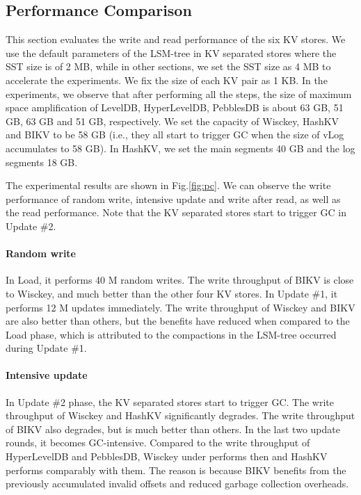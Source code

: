 \documentclass[sigconf]{acmart}
\begin{document}
\subsection{Performance Comparison}
This section evaluates the write and read performance of the six KV stores. We use the default parameters of the LSM-tree in KV separated stores where the SST size is of 2 MB, while in other sections, we set the SST size as 4 MB to accelerate the experiments. We fix the size of each KV pair as 1 KB. In the experiments, we observe that after performing all the steps, the size of maximum space amplification of LevelDB, HyperLevelDB, PebblesDB {\color{red}{KVell}} is about 63 GB, 51 GB, 63 GB and 51 GB, respectively.  We set the capacity of Wisckey, HashKV and BIKV to be 58 GB (i.e., they all start to trigger GC when the size of vLog accumulates to 58 GB). In HashKV, we set the main segments 40 GB and the log segments 18 GB. 

The experimental results are shown in Fig.\ref{fig:pc}. We can observe the write performance of random write, intensive update and write after read, as well as the read performance. Note that the KV separated stores start to trigger GC in Update \#2.

\paragraph*{Random write}
In Load, it performs 40 M random writes. The write throughput of BIKV is close to Wisckey, and much better than the other four KV stores. In Update \#1, it performs 12 M updates immediately. The write throughput of Wisckey and BIKV are also better than others, but the benefits have reduced when compared to the Load phase, which is attributed to the compactions in the LSM-tree occurred during Update \#1. {\color{red}{The write throughput of KVell significantly degrades caused by the costly update operation.}}

\paragraph*{Intensive update}
In Update \#2 phase, the KV separated stores start to trigger GC. The write throughput of Wisckey and HashKV significantly degrades. The write throughput of BIKV also degrades, but is much better than others. In the last two update rounds, it becomes GC-intensive. Compared to the write throughput of HyperLevelDB and PebblesDB, Wisckey under performs then and HashKV performs comparably with them. The reason is because BIKV benefits from the previously accumulated invalid offsets and reduced garbage collection overheads. {\color{red}{The write throughput of KVell is stable under update-intensive workloads.}}
\end{document}
